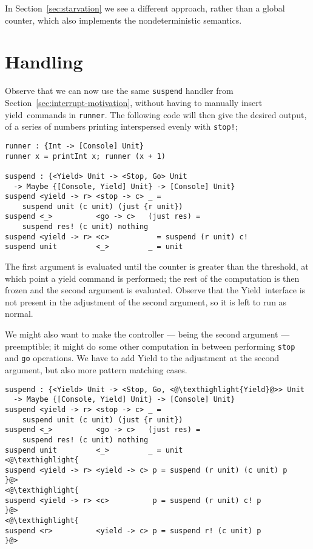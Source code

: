 \documentclass[msc,deptreport,cs]{infthesis} %
\newcommand{\code}[1]{\lstinline{#1}}
\newcommand{\texthighlight}[1]{%
  \colorbox{red!20}{#1}}
\newcommand\yield{\textsf{yield}\xspace}
\newcommand\Yield{\textsf{Yield}\xspace}
\begin{document}

In Section~\ref{sec:starvation} we see a different approach, rather than a
global counter, which also implements the nondeterministic semantics.

\section{Handling}
\label{sec:handling}

Observe that we can now use the same \code{suspend} handler from
Section~\ref{sec:interrupt-motivation}, without having to manually insert
\yield~commands in \code{runner}. The following code will then give the desired
output, of a series of numbers printing interspersed evenly with \code{stop!};

\begin{lstlisting}
runner : {Int -> [Console] Unit}
runner x = printInt x; runner (x + 1)

suspend : {<Yield> Unit -> <Stop, Go> Unit
  -> Maybe {[Console, Yield] Unit} -> [Console] Unit}
suspend <yield -> r> <stop -> c> _ =
    suspend unit (c unit) (just {r unit})
suspend <_>          <go -> c>   (just res) =
    suspend res! (c unit) nothing
suspend <yield -> r> <c>           = suspend (r unit) c!
suspend unit         <_>         _ = unit
\end{lstlisting}

The first argument is evaluated until the counter is greater than the threshold,
at which point a yield command is performed; the rest of the computation is then
frozen and the second argument is evaluated. Observe that the \Yield~interface
is not present in the adjustment of the second argument, so it is left to run
as normal.

We might also want to make the controller --- being the second argument ---
preemptible; it might do some other computation in between performing
\code{stop} and \code{go} operations. We have to add \Yield to the adjustment at
the second argument, but also more pattern matching cases.

\begin{lstlisting}[]
suspend : {<Yield> Unit -> <Stop, Go, <@\texthighlight{Yield}@>> Unit
  -> Maybe {[Console, Yield] Unit} -> [Console] Unit}
suspend <yield -> r> <stop -> c> _ =
    suspend unit (c unit) (just {r unit})
suspend <_>          <go -> c>   (just res) =
    suspend res! (c unit) nothing
suspend unit         <_>         _ = unit
<@\texthighlight{
suspend <yield -> r> <yield -> c> p = suspend (r unit) (c unit) p
}@>
<@\texthighlight{
suspend <yield -> r> <c>          p = suspend (r unit) c! p
}@>
<@\texthighlight{
suspend <r>          <yield -> c> p = suspend r! (c unit) p
}@>
\end{lstlisting}
\end{document}
